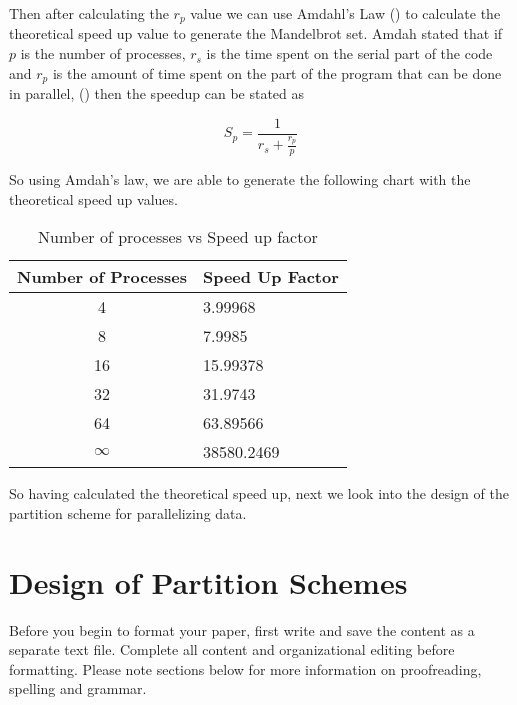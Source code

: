 \documentclass[conference]{IEEEtran}
\begin{document}
			Then after calculating the $r_p$ value we can use Amdahl's Law () to calculate the theoretical speed up value to generate the Mandelbrot set. Amdah stated that if $p$ is the number of processes, $r_s$ is the time spent on the serial part of the code and $r_p$ is the amount of time spent on the part of the program that can be done in parallel, () then the speedup can be stated as 
			
			\begin{equation}
				S_p = \frac{1}{r_s + \frac{r_p}{p}}
			\end{equation}
			
			So using Amdah's law, we are able to generate the following chart with the theoretical speed up values.
			
			\begin{table}[!h]\caption{Number of processes vs Speed up factor}
				\begin{center}
					\begin{tabular}{|c|l|} 
						\hline
						\textbf{Number of Processes} & \textbf{Speed Up Factor} \\ \hline
						4                  & 3.99968                     \\
						8                   & 7.9985                       \\
						16                 & 15.99378                       \\
						32                & 31.9743                       \\
						64                  & 63.89566                       \\
						 $\infty$      & 38580.2469                       \\ \hline
					\end{tabular}
				\end{center}
			\end{table}
			
			So having calculated the theoretical speed up, next we look into the design of the partition scheme for parallelizing data.
			
			
	\section{Design of Partition Schemes}
	Before you begin to format your paper, first write and save the content as a 
	separate text file. Complete all content and organizational editing before 
	formatting. Please note sections  below for more information on 
	proofreading, spelling and grammar.
	
\end{document}

